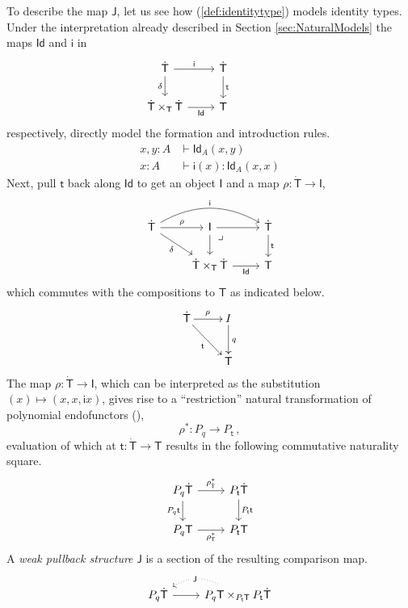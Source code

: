 \documentclass[12pt,reqno]{amsart}
\renewcommand{\to}{\ensuremath{\rightarrow}}
\newcommand{\Id}{\mathsf{Id}}
\renewcommand{\t}{\ensuremath{\mathsf{t}}}
\newcommand{\T}{\ensuremath{\mathsf{T}}}
\newcommand{\TT}{\ensuremath{\dot{\mathsf{T}}}}
\newcommand{\pbcorner}{\arrow[dr,phantom,"\lrcorner" very near start, shift right=.5ex]} %
\theoremstyle{remark}
\theoremstyle{definition}
\begin{document}
To describe the map $\mathsf{J}$, let us see how (\ref{def:identitytype}) models identity types.  Under the interpretation already described in Section \ref{sec:NaturalModels} the maps $\Id$ and $\mathsf{i}$  in 
\begin{equation*}%
\begin{tikzcd}
	\TT \ar[r,"\mathsf{i}"] \ar[d,swap,"\delta"] &  \TT \ar[d, "\t"]\\  
	\TT \times_\T \TT \ar[r, swap,"\mathsf{Id}"] & \T
 \end{tikzcd}\qquad \qquad 
 \end{equation*}
respectively, directly model the formation and introduction rules.
\begin{align*}
x, y:A &\vdash \Id_A(x, y)\\
x: A &\vdash \mathsf{i}(x) : \Id_A(x, x)
\end{align*}
Next, pull $\t$ back along $\mathsf{Id}$ to get an object $\mathsf{I}$ and a map $\rho  : \TT \to \mathsf{I}$,
%
\begin{equation*}%
\begin{tikzcd}
\TT \ar[rd,swap,"{\delta}"] \ar[r,"{\rho}"] \ar[rr, bend left,"{\mathsf{i}}"] & \mathsf{I} \ar[r]  \ar[d] \pbcorner &  \TT \ar[d, "\t"]\\
& \TT \times_\T \TT  \ar[r, swap,"{\mathsf{Id}}"]  & \T
\end{tikzcd}
\end{equation*}
%
which commutes with the compositions to $\T$ as indicated below.
%
\begin{equation*}%
\xymatrix{
\TT \ar[rd]_{\t} \ar[r]^{\rho} & I \ar[d]^{q}  \\
& \T 
}
\end{equation*}
%
The map $\rho  : \TT \to \mathsf{I}$, which can be interpreted as the substitution $(x) \mapsto (x, x, \mathsf{i}x)$, gives rise to a ``restriction'' natural transformation of polynomial endofunctors (\cite{GK}),
\[
\rho^* : P_q \to P_\t\,,
\]
evaluation of which at $\t:\TT \to\T$ results in the following commutative naturality square.
\begin{equation}\label{diag:prod2}
\begin{tikzcd}
P_q\TT \ar[d,swap, "{P_q \t}"] \ar[r, "{\rho^{*}_{\TT}}"] & P_\t\TT \ar[d, "{P_\t \t}"] \\
P_q\T \ar[r,swap, "{\rho^{*}_{\T}}"] &  P_\t\T 
\end{tikzcd}
\end{equation}
%
A \emph{weak pullback structure} $\mathsf{J}$ is a section of the resulting comparison map.
\begin{equation}\label{def:wps}
\begin{tikzcd}
P_q \TT  \ar[r] & \ar[l, bend right, dotted, "\mathsf{J}" description] P_q\T \times_{P_\t\T} P_\t\TT 
\end{tikzcd}
\end{equation}
\end{document}
